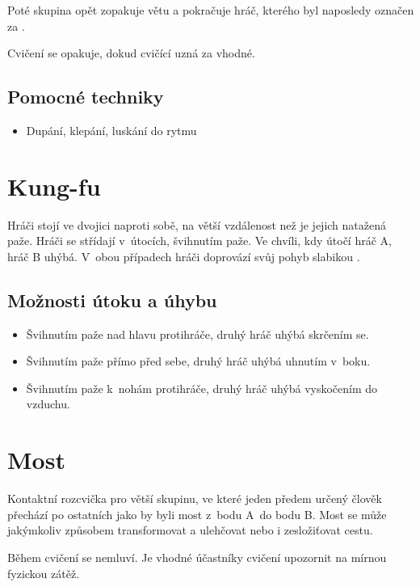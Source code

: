 Poté skupina opět zopakuje větu a pokračuje hráč, kterého byl naposledy označen za  . 
 
Cvičení se opakuje, dokud cvičící uzná za vhodné. 
 
\subsection{ Pomocné techniky } \begin{itemize}
\item  Dupání, klepání, luskání do rytmu
\end{itemize}
 
 
 
 
 
\needspace{5cm} \section{Kung-fu} \label{kung-fu} Hráči stojí ve dvojici naproti sobě, na větší vzdálenost než je jejich natažená paže. Hráči se střídají v~útocích, švihnutím paže. Ve chvíli, kdy útočí hráč A, hráč B uhýbá. V~obou případech hráči doprovází svůj pohyb slabikou  . 
 
\subsection{ Možnosti útoku a úhybu } \begin{itemize}
\item  Švihnutím paže nad hlavu protihráče, druhý hráč uhýbá skrčením se.
\item  Švihnutím paže přímo před sebe, druhý hráč uhýbá uhnutím v~boku.
\item  Švihnutím paže k~nohám protihráče, druhý hráč uhýbá vyskočením do vzduchu.
\end{itemize}
 
 
 
\needspace{5cm} \section{Most} \label{most} Kontaktní rozcvička pro větší skupinu, ve které jeden předem určený člověk přechází po ostatních jako by byli most z~bodu A~do bodu B. Most se může jakýmkoliv způsobem transformovat a ulehčovat nebo i zesložiťovat cestu. 
 
Během cvičení se nemluví. Je vhodné účastníky cvičení upozornit na mírnou fyzickou zátěž. 
 
 
 
